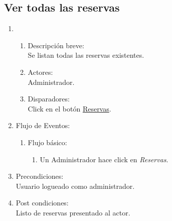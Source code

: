 \documentclass[a4paper,11pt]{article}
\begin{document}
\subsection{Ver todas las reservas}
\begin{enumerate}

    \item
    \begin{enumerate}
    \item Descripci\'on breve: \\
        Se listan todas las reservas existentes.
    \item Actores: \\
        Administrador.
    \item Disparadores: \\
        Click en el bot\'on \underline{Reservas}.
    \end{enumerate}

    \item Flujo de Eventos:

    \begin{enumerate}

        \item Flujo b\'asico:
    		\begin{enumerate}
            	\item Un Administrador hace click en \emph{Reservas}.
		\end{enumerate}
    \end{enumerate}

    \item Precondiciones: \\
        Usuario logueado como administrador.

    \item Post condiciones: \\
        Listo de reservas presentado al actor.

\end{enumerate}

\end{document}
